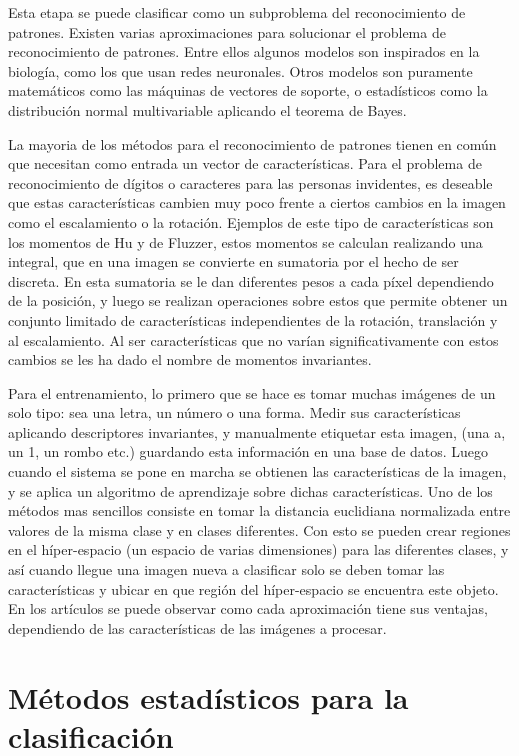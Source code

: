 \documentclass[a4paper, 11pt, oneside]{report}
\begin{document}
Esta etapa se puede clasificar como un subproblema del reconocimiento de patrones. Existen varias aproximaciones para solucionar el problema de reconocimiento de patrones. Entre ellos algunos modelos son inspirados en la biología, como los que usan redes neuronales. Otros modelos son puramente matemáticos como las máquinas de vectores de soporte, o estadísticos como la distribución normal multivariable aplicando el teorema de Bayes.

La  mayoria de los métodos para el reconocimiento de patrones tienen en común que necesitan como entrada un vector de características. Para el problema de reconocimiento de dígitos o caracteres para las personas invidentes, es deseable que estas características cambien muy poco frente a ciertos cambios en la imagen como el escalamiento o la rotación. Ejemplos de este tipo de características son los momentos de Hu y de Fluzzer, estos momentos se calculan realizando una integral, que en una imagen se convierte en sumatoria por el hecho de ser discreta. En esta sumatoria se le dan diferentes pesos a cada píxel dependiendo de la posición, y luego se realizan operaciones sobre estos que permite obtener un conjunto limitado de características independientes de la rotación, translación y al escalamiento. Al ser características que no varían significativamente con estos  cambios se les ha dado el nombre de momentos invariantes.

Para el entrenamiento, lo primero que se hace es tomar muchas imágenes de un solo tipo: sea una letra, un  número o una forma. Medir sus características aplicando descriptores invariantes, y manualmente  etiquetar esta imagen, (una a, un 1, un rombo etc.) guardando esta información en una base de datos. Luego cuando el sistema se pone en marcha se obtienen las características de la imagen, y se aplica un algoritmo de aprendizaje sobre dichas características. Uno de los métodos mas sencillos consiste en tomar la distancia euclidiana normalizada entre valores de la misma clase y en clases diferentes. Con esto se pueden crear regiones en el híper-espacio (un espacio de varias dimensiones) para las diferentes clases, y así cuando llegue una imagen nueva a clasificar solo se deben tomar las características y ubicar en que región del híper-espacio se encuentra este objeto. En los artículos se puede observar como   cada aproximación tiene sus ventajas, dependiendo de las características de las imágenes a procesar.
    
    
\chapter{Métodos estadísticos para la clasificación}
\label{chap:ml}
\end{document}
